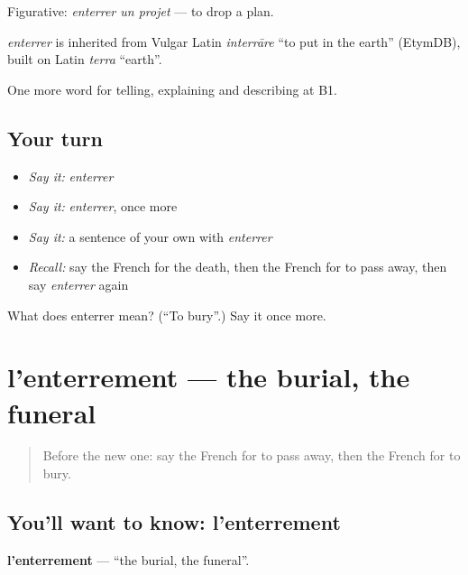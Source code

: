 Figurative: \emph{enterrer un projet} — to drop a plan.

\begin{cousinweb}
\emph{enterrer} is inherited from Vulgar Latin \emph{interrāre} \textquotedblleft{}to put in the earth\textquotedblright{} (EtymDB), built on Latin \emph{terra} \textquotedblleft{}earth\textquotedblright{}.
\end{cousinweb}

\begin{grammarlens}[title={What you've built}]
One more word for telling, explaining and describing at B1.
\end{grammarlens}

\subsection*{Your turn}
\begin{itemize}
\raggedright
  \item \emph{Say it:} \emph{enterrer}
  \item \emph{Say it:} \emph{enterrer}, once more
  \item \emph{Say it:} a sentence of your own with \emph{enterrer}
  \item \emph{Recall:} say the French for the death, then the French for to pass away, then say \emph{enterrer} again
\end{itemize}

\begin{tcolorbox}[breakable,colback=teal!4,colframe=teal!35!black,title={Before you move on}]
What does enterrer mean? (\textquotedblleft{}To bury\textquotedblright{}.) Say it once more.
\end{tcolorbox}
\section[l'enterrement]{l'enterrement — the burial, the funeral}

\label{lesson:FR-C314-enterrement}



\begin{quote}
Before the new one: say the French for to pass away, then the French for to bury.
\end{quote}

\subsection*{You'll want to know: l'enterrement}
\textbf{l'enterrement} — \textquotedblleft{}the burial, the funeral\textquotedblright{}.

